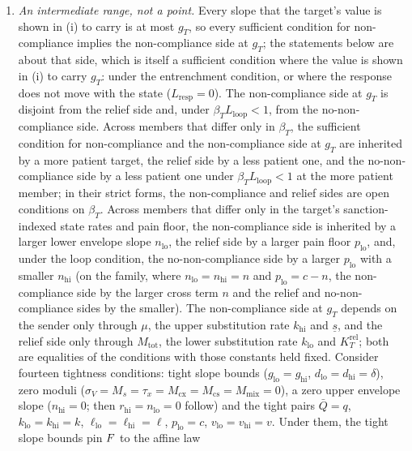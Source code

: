 \begin{proposition}
\begin{enumerate}[label=(\roman*)]
not a target best reply at the non-compliance-profile values, so no equilibrium with
those values has the target maintaining non-compliance.
\item \emph{An intermediate range, not a point.} Every slope that the target's value
is shown in (i) to carry is at most
$g_T$, so every sufficient condition for non-compliance implies the non-compliance side at $g_T$; the
statements below are about that side, which is itself a sufficient condition where
the value is shown in (i) to carry $g_T$: under the entrenchment condition, or where the response does
not move with the state ($L_{\mathrm{resp}}=0$). The non-compliance side at $g_T$ is
disjoint from the relief side and, under $\beta_TL_{\mathrm{loop}}<1$, from the
no-non-compliance side. Across members that differ only in $\beta_T$, the sufficient
condition for non-compliance and the non-compliance side at $g_T$ are inherited by a more patient target,
the relief side by a less patient
one, and the no-non-compliance side by a less patient one under
$\beta_TL_{\mathrm{loop}}<1$ at the more patient member; in their strict forms,
the non-compliance and relief sides are open conditions on $\beta_T$. Across members that differ only
in the target's sanction-indexed state rates and pain floor, the non-compliance side
is inherited by a larger lower envelope slope $n_{\mathrm{lo}}$, the relief side
by a larger pain floor $p_{\mathrm{lo}}$, and, under the loop condition, the
no-non-compliance side by a larger $p_{\mathrm{lo}}$ with a smaller $n_{\mathrm{hi}}$
(on the family, where $n_{\mathrm{lo}}=n_{\mathrm{hi}}=n$ and $p_{\mathrm{lo}}=c-n$,
the non-compliance side by the larger cross term $n$ and the relief and
no-non-compliance sides by the smaller). The non-compliance side at
$g_T$ depends on the sender only through $\mu$, the upper substitution rate
$k_{\mathrm{hi}}$ and $\underline s$, and the relief side only through
$M_{\mathrm{tot}}$, the lower substitution rate $k_{\mathrm{lo}}$ and
$K_T^{\mathrm{rel}}$; both are equalities of the conditions with those constants
held fixed. Consider fourteen tightness conditions: tight slope bounds
($g_{\mathrm{lo}}=g_{\mathrm{hi}}$, $d_{\mathrm{lo}}=d_{\mathrm{hi}}=\delta$), zero
moduli ($\sigma_V=M_s=\tau_x=M_{\mathrm{cx}}=M_{\mathrm{cs}}=M_{\mathrm{mix}}=0$),
a zero upper envelope slope ($n_{\mathrm{hi}}=0$; then
$r_{\mathrm{hi}}=n_{\mathrm{lo}}=0$ follow) and the tight pairs
$\bar Q=q$, $k_{\mathrm{lo}}=k_{\mathrm{hi}}=k$,
$\ell_{\mathrm{lo}}=\ell_{\mathrm{hi}}=\ell$, $p_{\mathrm{lo}}=c$,
$v_{\mathrm{lo}}=v_{\mathrm{hi}}=v$. Under them, the tight slope bounds pin $F$ to the affine law

\end{enumerate}
\end{proposition}
